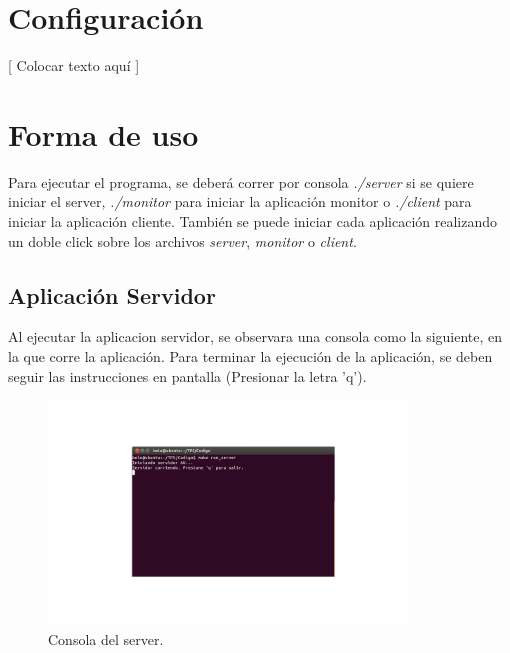 \documentclass{article}
\begin{document}
\section{Configuración}
	
	[ Colocar texto aquí ]
\bigskip




\section{Forma de uso}
	
	Para ejecutar el programa, se deberá correr por consola \textit{./server} si se quiere iniciar el server, \textit{./monitor} para iniciar la aplicación monitor o \textit{./client} para iniciar la aplicación cliente. También se puede iniciar cada aplicación realizando un doble click sobre los archivos \textit{server}, \textit{monitor} o \textit{client}.

\subsection{Aplicación Servidor}
\smallskip 
	Al ejecutar la aplicacion servidor, se observara una consola como la siguiente, en la que corre la aplicación. Para terminar la ejecución de la aplicación, se deben seguir las instrucciones en pantalla (Presionar la letra 'q').	
	\begin{figure}[h]
       \centering
       \includegraphics[width=0.85\textwidth]{Server.png}
	\bigskip
       \caption{Consola del server.}
	\end{figure}
\end{document}
